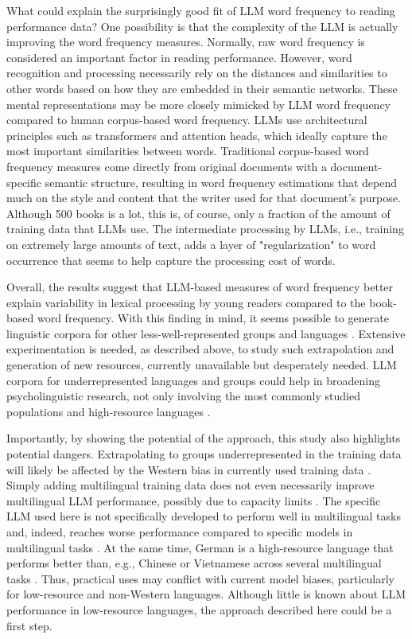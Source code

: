 \documentclass[doc, a4paper]{apa7}
\begin{document}
What could explain the surprisingly good fit of LLM word frequency to reading performance data? One possibility is that the complexity of the LLM is actually improving the word frequency measures. Normally, raw word frequency is considered an important factor in reading performance. However, word recognition and processing necessarily rely on the distances and similarities to other words based on how they are embedded in their semantic networks. These mental representations may be more closely mimicked by LLM word frequency compared to human corpus-based word frequency. LLMs use architectural principles such as transformers and attention heads, which ideally capture the most important similarities between words. Traditional corpus-based word frequency measures come directly from original documents with a document-specific semantic structure, resulting in word frequency estimations that depend much on the style and content that the writer used for that document's purpose. Although 500 books is a lot, this is, of course, only a fraction of the amount of training data that LLMs use. The intermediate processing by LLMs, i.e., training on extremely large amounts of text, adds a layer of "regularization" to word occurrence that seems to help capture the processing cost of words. 

Overall, the results suggest that LLM-based measures of word frequency better explain variability in lexical processing by young readers compared to the book-based word frequency. With this finding in mind, it seems possible to generate linguistic corpora for other less-well-represented groups and languages \citep[][]{gagl_eye_2022, blasi_over-reliance_2022}. Extensive experimentation is needed, as described above, to study such extrapolation and generation of new resources, currently unavailable but desperately needed. LLM corpora for underrepresented languages and groups could help in broadening psycholinguistic research, not only involving the most commonly studied populations and high-resource languages \citep{henrich_weirdest_2010, blasi_over-reliance_2022}. 

Importantly, by showing the potential of the approach, this study also highlights potential dangers. Extrapolating to groups underrepresented in the training data will likely be affected by the Western bias in currently used training data \citep{atari_which_2023}. Simply adding multilingual training data does not even necessarily improve multilingual LLM performance, possibly due to capacity limits \citep{chang_when_2023}. The specific LLM used here is not specifically developed to perform well in multilingual tasks and, indeed, reaches worse performance compared to specific models in multilingual tasks \citep{lai_chatgpt_2023}. At the same time, German is a high-resource language that performs better than, e.g., Chinese or Vietnamese across several multilingual tasks \citep{lai_chatgpt_2023}. Thus, practical uses may conflict with current model biases, particularly for low-resource and non-Western languages. Although little is known about LLM performance in low-resource languages, the approach described here could be a first step. 
\end{document}
